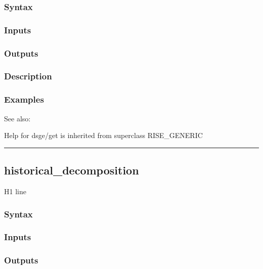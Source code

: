 \documentclass[letterpaper,10pt,english]{sphinxmanual}
\begin{document}
\subsubsection{Syntax}
\label{classes/models/@dsge/dsge:id51}

\subsubsection{Inputs}
\label{classes/models/@dsge/dsge:id52}

\subsubsection{Outputs}
\label{classes/models/@dsge/dsge:id53}

\subsubsection{Description}
\label{classes/models/@dsge/dsge:id54}

\subsubsection{Examples}
\label{classes/models/@dsge/dsge:id55}
See also:

Help for dsge/get is inherited from superclass RISE\_GENERIC


\bigskip\hrule{}\bigskip



\subsection{historical\_decomposition}
\label{classes/models/@dsge/dsge:id56}\label{classes/models/@dsge/dsge:historical-decomposition}
H1 line


\subsubsection{Syntax}
\label{classes/models/@dsge/dsge:id57}

\subsubsection{Inputs}
\label{classes/models/@dsge/dsge:id58}

\subsubsection{Outputs}
\label{classes/models/@dsge/dsge:id59}
\end{document}
